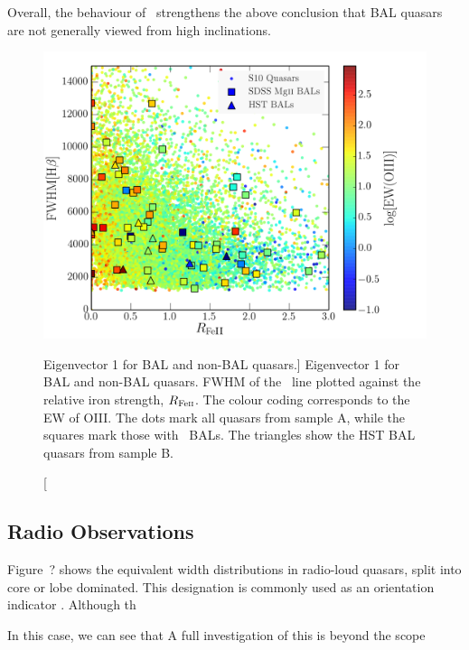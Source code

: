 Overall, the behaviour of \fwh\ strengthens the above 
conclusion that BAL quasars are not generally viewed from 
high inclinations.

\begin{figure}
\centering
\includegraphics[width=1.0\textwidth]{figures/ewpaper/ev1_colour.png}
\caption
[Eigenvector 1 for BAL and non-BAL quasars.]
{
Eigenvector 1 for BAL and non-BAL quasars. 
FWHM of the \hb\ line plotted against the relative
iron strength, $R_{{\rm Fe \textsc{ii}}}$. The colour coding
corresponds to the EW of OIII. The dots mark all quasars from
sample A, while the squares mark those with \mgii\ BALs.
The triangles show the HST BAL quasars from sample B.
}
\label{fig:bal_ev1}
\end{figure}



\subsection{Radio Observations}

Figure~? shows the equivalent width distributions in radio-loud quasars, 
split into core or lobe dominated. This designation is commonly used
as an orientation indicator \citep{orr1982,wills1995}. 
Although th


In this case, we can
see that 
A full investigation of this is beyond the scope 



